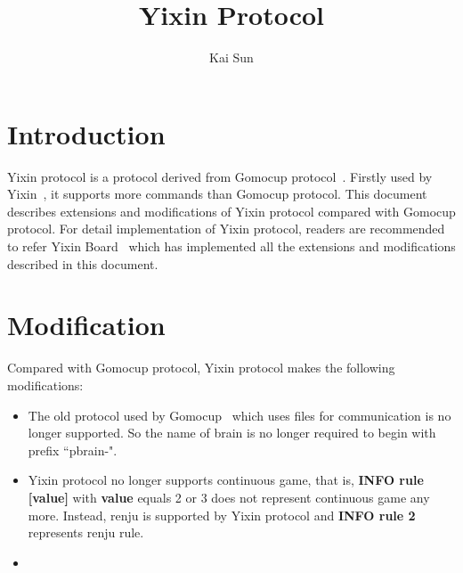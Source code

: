\documentclass[a4paper,12pt]{article}
\begin{document}
\newtheorem{theorem}{Theorem}[section]
\newtheorem{lemma}{Lemma}[section]
\newtheorem{definition}{Definition}[section]
\newtheorem*{myproof}{Proof}
\newtheorem*{myexercise}{Exercise}
\newtheorem*{myproblem}{Problem}
\author{Kai Sun}
\title{Yixin Protocol}
\maketitle

\section{Introduction}
Yixin protocol is a protocol derived from Gomocup protocol~\cite{gomocup-protocol}. Firstly used by Yixin~\cite{yixin}, it supports more commands than Gomocup protocol. This document describes extensions and modifications of Yixin protocol compared with Gomocup protocol. For detail implementation of Yixin protocol, readers are recommended to refer Yixin Board~\cite{yixin-board} which has implemented all the extensions and modifications described in this document.

\section{Modification}
Compared with Gomocup protocol, Yixin protocol makes the following modifications:
\begin{itemize}
\item The old protocol used by Gomocup~\cite{old-gomocup-protocol} which uses files for communication is no longer supported. So the name of brain is no longer required to begin with prefix ``pbrain-".
\item Yixin protocol no longer supports continuous game, that is, \textbf{INFO rule [value]} with \textbf{value} equals 2 or 3 does not represent continuous game any more. Instead, renju is supported by Yixin protocol and \textbf{INFO rule 2} represents renju rule.
\item 
\end{itemize}
\end{document}
